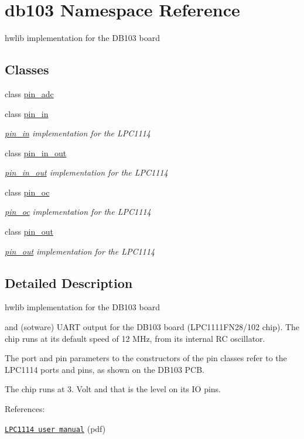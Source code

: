 \hypertarget{namespacedb103}{}\section{db103 Namespace Reference}
\label{namespacedb103}


hwlib implementation for the D\+B103 board  


\subsection*{Classes}
\begin{DoxyCompactItemize}
\item 
class \hyperlink{classdb103_1_1pin__adc}{pin\+\_\+adc}
\item 
class \hyperlink{classdb103_1_1pin__in}{pin\+\_\+in}
\begin{DoxyCompactList}\small\item\em \hyperlink{classdb103_1_1pin__in}{pin\+\_\+in} implementation for the L\+P\+C1114 \end{DoxyCompactList}\item 
class \hyperlink{classdb103_1_1pin__in__out}{pin\+\_\+in\+\_\+out}
\begin{DoxyCompactList}\small\item\em \hyperlink{classdb103_1_1pin__in__out}{pin\+\_\+in\+\_\+out} implementation for the L\+P\+C1114 \end{DoxyCompactList}\item 
class \hyperlink{classdb103_1_1pin__oc}{pin\+\_\+oc}
\begin{DoxyCompactList}\small\item\em \hyperlink{classdb103_1_1pin__oc}{pin\+\_\+oc} implementation for the L\+P\+C1114 \end{DoxyCompactList}\item 
class \hyperlink{classdb103_1_1pin__out}{pin\+\_\+out}
\begin{DoxyCompactList}\small\item\em \hyperlink{classdb103_1_1pin__out}{pin\+\_\+out} implementation for the L\+P\+C1114 \end{DoxyCompactList}\end{DoxyCompactItemize}


\subsection{Detailed Description}
hwlib implementation for the D\+B103 board 

 and (sotware) U\+A\+RT output for the D\+B103 board (L\+P\+C1111\+F\+N28/102 chip). The chip runs at its default speed of 12 M\+Hz, from its internal RC oscillator.

The port and pin parameters to the constructors of the pin classes refer to the L\+P\+C1114 ports and pins, as shown on the D\+B103 P\+CB.

The chip runs at 3. Volt and that is the level on its IO pins.

References\+:
\begin{DoxyItemize}
\item \href{http://www.nxp.com/documents/user_manual/UM10398.pdf}{\tt L\+P\+C1114 user manual} (pdf) 
\end{DoxyItemize}